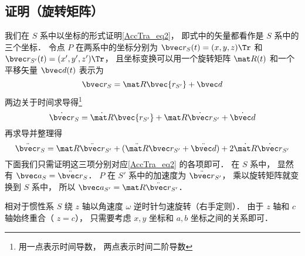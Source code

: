 \subsection{证明（旋转矩阵）}
我们在 $S$ 系中以坐标的形式证明\autoref{AccTra_eq2}， 即式中的矢量都看作是 $S$ 系中的三个坐标． 令点 $P$ 在两系中的坐标分别为 $\bvec r_S(t) = (x, y, z)\Tr$ 和 $\bvec r_{S'}(t) = (x', y', z')\Tr$， 且坐标变换可以用一个旋转矩阵 $\mat R(t)$ 和一个平移矢量 $\bvec d(t)$ 表示为
\begin{equation}
\bvec r_S = \mat R \bvec{r_{S'}} + \bvec d
\end{equation}
两边关于时间求导得\footnote{用一点表示时间导数， 两点表示时间二阶导数}
\begin{equation}
\dot{\bvec r}_S = \dot{\mat R} \bvec{r_{S'}} + \mat R \dot{\bvec r}_{S'}+ \dot{\bvec d}
\end{equation}
再求导并整理得
\begin{equation}
\ddot{\bvec r}_S = \mat R \ddot{\bvec r}_{S'} + (\ddot{\mat R} \bvec r_{S'} + \ddot{\bvec d}) + 2 \dot{\mat R} \dot{\bvec r}_{S'}
\end{equation}
下面我们只需证明这三项分别对应\autoref{AccTra_eq2} 的各项即可． 在 $S$ 系中， 显然有 $\bvec a_S = \ddot{\bvec r}_S$． $P$ 在 $S'$ 系中的加速度为 $\ddot{\bvec r}_{S'}$， 乘以旋转矩阵就变换到 $S$ 系中， 所以 $\bvec a_{S'} = \mat R \ddot{\bvec r}_{S'}$．

相对于惯性系 $S$ 绕 $z$ 轴以角速度 $\omega$ 逆时针匀速旋转（右手定则）． 由于 $z$ 轴和 $c$ 轴始终重合（ $z=c$）， 只需要考虑 $x,y$ 坐标和 $a,b$ 坐标之间的关系即可．

